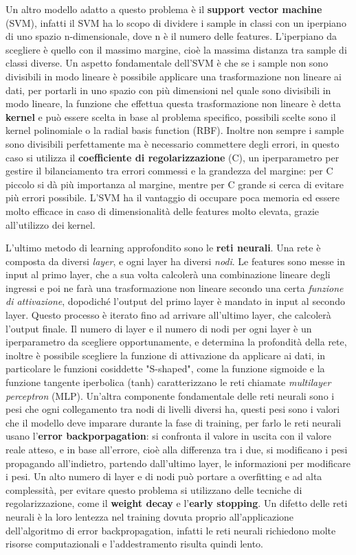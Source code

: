 Un altro modello adatto a questo problema è il \textbf{support vector machine} (SVM), infatti il SVM ha lo scopo di dividere i sample in classi con un iperpiano di uno spazio n-dimensionale, dove n è il numero delle features. L'iperpiano da scegliere è quello con il massimo margine, cioè la massima distanza tra sample di classi diverse. Un aspetto fondamentale dell'SVM è che se i sample non sono divisibili in modo lineare è possibile applicare una trasformazione non lineare ai dati, per portarli in uno spazio con più dimensioni nel quale sono divisibili in modo lineare, la funzione che effettua questa trasformazione non lineare è detta \textbf{kernel} e può essere scelta in base al problema specifico, possibili scelte sono il kernel polinomiale o la radial basis function (RBF). Inoltre non sempre i sample sono divisibili perfettamente ma è necessario commettere degli errori, in questo caso si utilizza il \textbf{coefficiente di regolarizzazione} (C), un iperparametro per gestire il bilanciamento tra errori commessi e la grandezza del margine: per C piccolo si dà più importanza al margine, mentre per C grande si cerca di evitare più errori possibile. L'SVM ha il vantaggio di occupare poca memoria ed essere molto efficace in caso di dimensionalità delle features molto elevata, grazie all'utilizzo dei kernel.

L'ultimo metodo di learning approfondito sono le \textbf{reti neurali}. Una rete è composta da diversi \textit{layer}, e ogni layer ha diversi \textit{nodi}. Le features sono messe in input al primo layer, che a sua volta calcolerà una combinazione lineare degli ingressi e poi ne farà una trasformazione non lineare secondo una certa \textit{funzione di attivazione}, dopodiché l'output del primo layer è mandato in input al secondo layer. Questo processo è iterato fino ad arrivare all'ultimo layer, che calcolerà l'output finale. Il numero di layer e il numero di nodi per ogni layer è un iperparametro da scegliere opportunamente, e determina la profondità della rete, inoltre è possibile scegliere la funzione di attivazione da applicare ai dati, in particolare le funzioni cosiddette "S-shaped", come la funzione sigmoide e la funzione tangente iperbolica (tanh) caratterizzano le reti chiamate \textit{multilayer perceptron} (MLP).  Un'altra componente fondamentale delle reti neurali sono i pesi che ogni collegamento tra nodi di livelli diversi ha, questi pesi sono i valori che il modello deve imparare durante la fase di training, per farlo le reti neurali usano l'\textbf{error backporpagation}: si confronta il valore in uscita con il valore reale atteso, e in base all'errore, cioè alla differenza tra i due, si modificano i pesi propagando all'indietro, partendo dall'ultimo layer, le informazioni per modificare i pesi. Un alto numero di layer e di nodi può portare a overfitting e ad alta complessità, per evitare questo problema si utilizzano delle tecniche di regolarizzazione, come il \textbf{weight decay} e l'\textbf{early stopping}. Un difetto delle reti neurali è la loro lentezza nel training dovuta proprio all'applicazione dell'algoritmo di error backpropagation, infatti le reti neurali richiedono molte risorse computazionali e l'addestramento risulta quindi lento.

